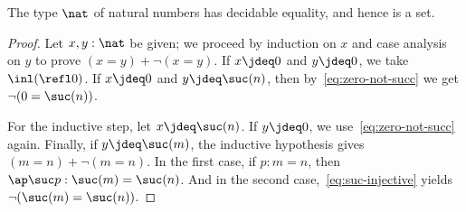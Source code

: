 %
\begin{thm}\label{prop:nat-is-set}
 The type $\nat$ of natural numbers has decidable equality, and hence is a set.
\end{thm}

\begin{proof}
  Let $x, y : \nat$ be given; we proceed by induction on $x$ and case analysis on $y$ to prove $(x=y)+\neg(x=y)$.
  If $x \jdeq 0$ and $y \jdeq 0$, we take $\inl(\refl0)$.
  If $x \jdeq 0$ and $y \jdeq \suc(n)$, then by~\eqref{eq:zero-not-succ} we get $\neg (0 = \suc (n))$.

  For the inductive step, let $x \jdeq \suc (n)$.
  If $y \jdeq 0$, we use~\eqref{eq:zero-not-succ} again.
  Finally, if $y \jdeq \suc (m)$, the inductive hypothesis gives $(m = n)+\neg(m = n)$.
  In the first case, if $p:m=n$, then $\ap \suc p:\suc(m)=\suc(n)$.
  And in the second case,~\eqref{eq:suc-injective} yields $\neg(\suc(m)=\suc(n))$.
\end{proof}
